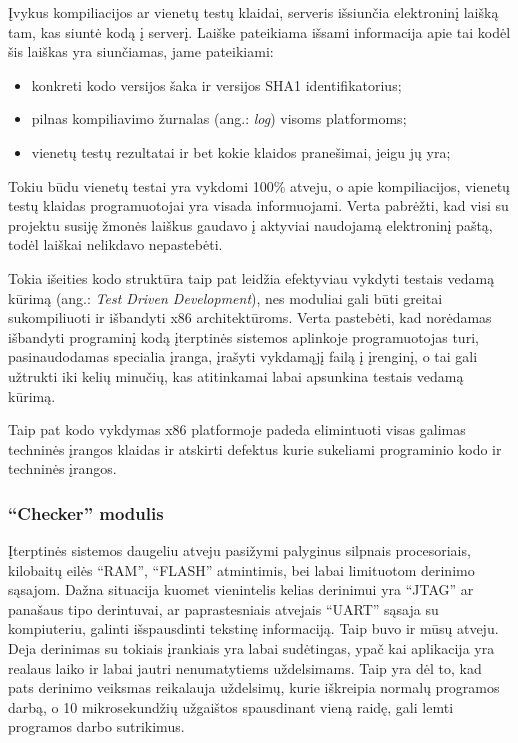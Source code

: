 \documentclass[12pt, a4paper, lithuanian, final]{article}
\begin{document}
Įvykus kompiliacijos ar vienetų testų klaidai, serveris išsiunčia elektroninį laišką tam, kas siuntė kodą į serverį.
Laiške pateikiama išsami informacija apie tai kodėl šis laiškas yra siunčiamas, jame pateikiami:
\begin{itemize}
	\item konkreti kodo versijos šaka ir versijos SHA1 identifikatorius;
	\item pilnas kompiliavimo žurnalas (ang.: \textit{log}) visoms platformoms;
	\item vienetų testų rezultatai ir bet kokie klaidos pranešimai, jeigu jų yra;
\end{itemize}

Tokiu būdu vienetų testai yra vykdomi 100\% atveju, o apie kompiliacijos, vienetų testų klaidas programuotojai yra visada informuojami.
Verta pabrėžti, kad visi su projektu susiję žmonės laiškus gaudavo į aktyviai naudojamą elektroninį paštą, todėl laiškai nelikdavo nepastebėti.

Tokia išeities kodo struktūra taip pat leidžia efektyviau vykdyti testais vedamą kūrimą (ang.: \textit{Test Driven Development}), nes moduliai gali būti greitai sukompiliuoti ir išbandyti x86 architektūroms. Verta pastebėti, kad norėdamas išbandyti programinį kodą įterptinės sistemos aplinkoje programuotojas turi, pasinaudodamas specialia įranga, įrašyti vykdamąjį failą į įrenginį, o tai gali užtrukti iki kelių minučių, kas atitinkamai labai apsunkina testais vedamą kūrimą.

Taip pat kodo vykdymas x86 platformoje padeda elimintuoti visas galimas techninės įrangos klaidas ir atskirti defektus kurie sukeliami programinio kodo ir techninės įrangos.





\subsubsection{"`Checker"' modulis}


Įterptinės sistemos daugeliu atveju pasižymi palyginus silpnais procesoriais, kilobaitų eilės "`RAM"', "`FLASH"' atmintimis, bei labai limituotom derinimo sąsajom.
Dažna situacija kuomet vienintelis kelias derinimui yra "`JTAG"' ar panašaus tipo derintuvai, ar paprastesniais atvejais "`UART"' sąsaja su kompiuteriu, galinti išspausdinti tekstinę informaciją.
Taip buvo ir mūsų atveju.
Deja derinimas su tokiais įrankiais yra labai sudėtingas, ypač kai aplikacija yra realaus laiko ir labai jautri nenumatytiems uždelsimams.
Taip yra dėl to, kad pats derinimo veiksmas reikalauja uždelsimų, kurie iškreipia normalų programos darbą, o 10 mikrosekundžių užgaištos spausdinant vieną raidę, gali lemti programos darbo sutrikimus.
\end{document}
